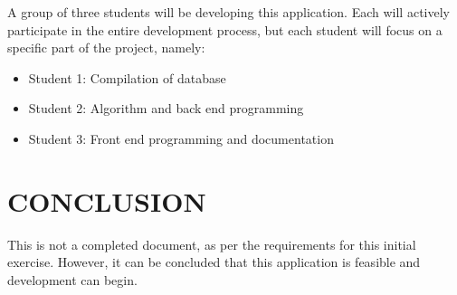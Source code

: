 	A group of three students will be developing this application. Each will actively participate in the entire development process, but each student will focus on a specific part of the project, namely:
	
	\begin{itemize}
	\item Student 1: Compilation of database
	\item Student 2: Algorithm and back end programming
	\item Student 3: Front end programming and documentation
	\end{itemize}

	\section{CONCLUSION}

	This is not a completed document, as per the requirements for this initial exercise. However, it can be concluded that this application is feasible and development can begin.






